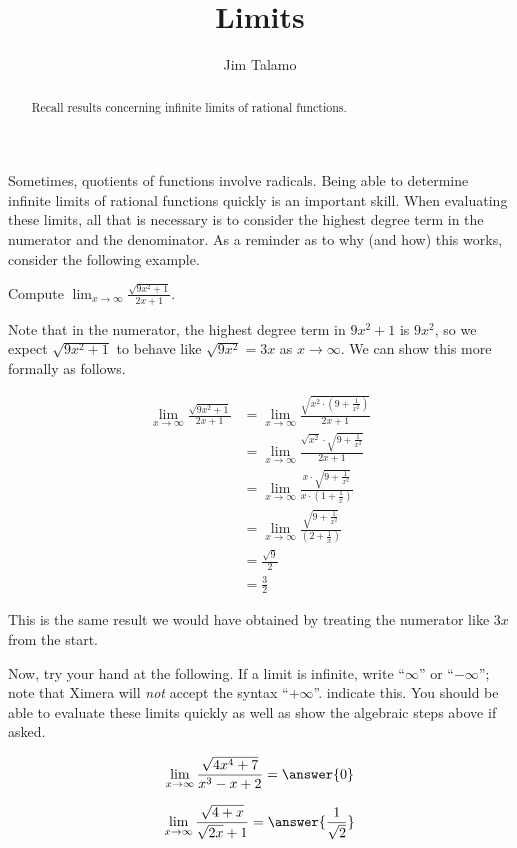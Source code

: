 \documentclass{ximera}
\author{Jim Talamo}
\title[Refresh:]{Limits}
\begin{document}
\begin{abstract}
Recall results concerning infinite limits of rational functions.
\end{abstract}
\maketitle

\begin{problem}
Sometimes, quotients of functions involve radicals.  Being able to determine infinite limits of rational functions quickly is an important skill.  When evaluating these limits, all that is necessary is to consider the highest degree term in the numerator and the denominator.  As a reminder as to why (and how) this works, consider the following example.

\begin{example}
Compute $\lim_{x \to \infty} \frac{\sqrt{9x^2+1}}{2x+1}$.

\begin{explanation}
Note that in the numerator, the highest degree term in $9x^2+1$ is $9x^2$, so we expect $\sqrt{9x^2+1}$ to behave like $\sqrt{9x^2} = 3x$ as $x \to \infty$.  We can show this more formally as follows.

\begin{align*}
\lim_{x \to \infty} \frac{\sqrt{9x^2+1}}{2x+1} &= \lim_{x \to \infty}  \frac{\sqrt{x^2 \cdot \left(9+\frac{1}{x^2}\right)}}{2x+1} \\
&= \lim_{x \to \infty} \frac{\sqrt{x^2} \cdot \sqrt{9+\frac{1}{x^2}}}{2x+1}  \\
&= \lim_{x \to \infty} \frac{x \cdot \sqrt{9+\frac{1}{x^2}}}{x \cdot\left(1+\frac{1}{x}\right)} \\
&= \lim_{x \to \infty} \frac{\sqrt{9+\frac{1}{x^2}}}{\left(2+\frac{1}{x}\right)} \\
&= \frac{\sqrt{9}}{2} \\
&=\frac{3}{2}
\end{align*}

This is the same result we would have obtained by treating the numerator like $3x$ from the start.
\end{explanation}
\end{example}

Now, try your hand at the following.  If a limit is infinite, write ``$\infty$'' or ``$-\infty$''; note that Ximera will \emph{not} accept the syntax ``$+\infty$''. indicate this.  You should be able to evaluate these limits quickly as well as show the algebraic steps above if asked.

\[
\lim_{x \to \infty} \frac{\sqrt{4x^4+7}}{x^3-x+2} = \answer{0}
\]

\[
\lim_{x \to \infty} \frac{\sqrt{4+x}}{\sqrt{2x}+1} = \answer{\frac{1}{\sqrt{2}}}
\]

\end{problem}
\end{document}
